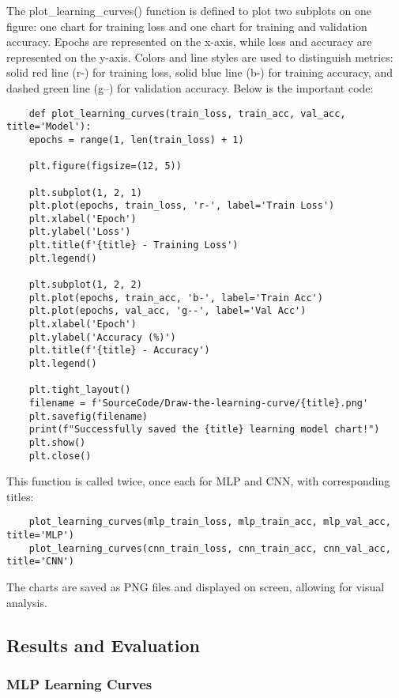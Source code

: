 \documentclass[12pt]{article}
\begin{document}
The plot\_learning\_curves() function is defined to plot two subplots on one figure: 
one chart for training loss and one chart for training and validation accuracy. 
Epochs are represented on the x-axis, while loss and accuracy are represented on 
the y-axis. Colors and line styles are used to distinguish metrics: solid red line 
(r-) for training loss, solid blue line (b-) for training accuracy, and dashed 
green line (g--) for validation accuracy. Below is the important code:

\begin{verbatim}
    def plot_learning_curves(train_loss, train_acc, val_acc, title='Model'):
    epochs = range(1, len(train_loss) + 1)
    
    plt.figure(figsize=(12, 5))
    
    plt.subplot(1, 2, 1)
    plt.plot(epochs, train_loss, 'r-', label='Train Loss')
    plt.xlabel('Epoch')
    plt.ylabel('Loss')
    plt.title(f'{title} - Training Loss')
    plt.legend()
    
    plt.subplot(1, 2, 2)
    plt.plot(epochs, train_acc, 'b-', label='Train Acc')
    plt.plot(epochs, val_acc, 'g--', label='Val Acc')
    plt.xlabel('Epoch')
    plt.ylabel('Accuracy (%)')
    plt.title(f'{title} - Accuracy')
    plt.legend()
    
    plt.tight_layout()
    filename = f'SourceCode/Draw-the-learning-curve/{title}.png'
    plt.savefig(filename)
    print(f"Successfully saved the {title} learning model chart!")
    plt.show()
    plt.close()
\end{verbatim}

This function is called twice, once each for MLP and CNN, with corresponding titles:

\begin{verbatim}
    plot_learning_curves(mlp_train_loss, mlp_train_acc, mlp_val_acc, title='MLP')
    plot_learning_curves(cnn_train_loss, cnn_train_acc, cnn_val_acc, title='CNN')
\end{verbatim}

The charts are saved as PNG files and displayed on screen, allowing for visual 
analysis.

\subsection{Results and Evaluation}

\subsubsection{MLP Learning Curves}
\end{document}
